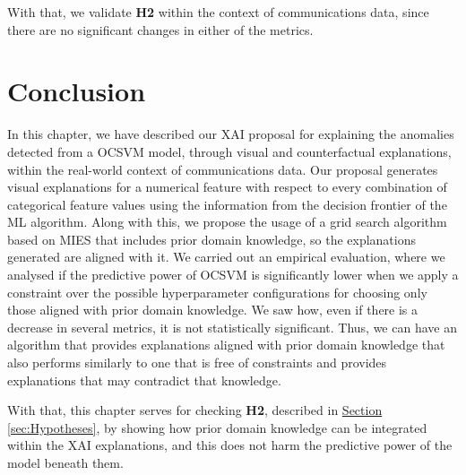 With that, we validate \textbf{H2} within the context of communications data, since there are no significant changes in either of the metrics.


\section{Conclusion}\label{sec:ch5-ConclusionComms}
In this chapter, we have described our XAI proposal for explaining the anomalies detected from a OCSVM model, through visual and counterfactual explanations, within the real-world context of communications data. Our proposal generates visual explanations for a numerical feature with respect to every combination of categorical feature values using the information from the decision frontier of the ML algorithm. Along with this, we propose the usage of a grid search algorithm based on MIES that includes prior domain knowledge, so the explanations generated are aligned with it.
We carried out an empirical evaluation, where we analysed if the predictive power of OCSVM is significantly lower when we apply a constraint over the possible hyperparameter configurations for choosing only those aligned with prior domain knowledge. We saw how, even if there is a decrease in several metrics, it is not statistically significant. Thus, we can have an algorithm that provides explanations aligned with prior domain knowledge that also performs similarly to one that is free of constraints and provides explanations that may contradict that knowledge.

With that, this chapter serves for checking \textbf{H2}, described in \hyperref[sec:Hypotheses]{Section} \ref{sec:Hypotheses}, by showing how prior domain knowledge can be integrated within the XAI explanations, and this does not harm the predictive power of the model beneath them.

